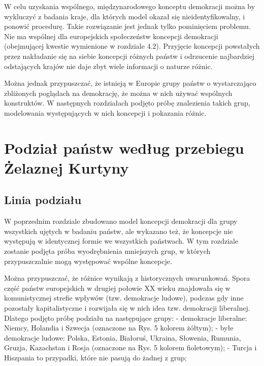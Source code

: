 \documentclass[12pt]{article}
\begin{document}
W celu uzyskania wspólnego, międzynarodowego konceptu demokracji można by wykluczyć z badania kraje, dla których model okazał się nieidentyfikowalny, i ponowić procedurę. Takie rozwiązanie jest jednak tylko pominięciem problemu. Nie ma wspólnej dla europejskich społeczeństw koncepcji demokracji (obejmującej kwestie wymienione w rozdziale 4.2). Przyjęcie koncepcji powstałych przez nakładanie się na siebie koncepcji różnych państw i odrzucenie najbardziej odstających krajów nie daje zbyt wiele informacji o naturze różnic.

Można jednak przypuszczać, że istnieją w Europie grupy państw o wystarczająco zbliżonych poglądach na demokrację, że można w nich używać wspólnych konstruktów. W następnych rozdziałach podjęto próbę znalezienia takich grup, modelowania występujących w nich koncepcji i pokazania różnic.

\newpage

\hypertarget{podziaux142-paux144stw-wedux142ug-przebiegu-ux17celaznej-kurtyny}{%
\section{Podział państw według przebiegu Żelaznej Kurtyny}\label{podziaux142-paux144stw-wedux142ug-przebiegu-ux17celaznej-kurtyny}}

\hypertarget{linia-podziaux142u}{%
\subsection{Linia podziału}\label{linia-podziaux142u}}

W poprzednim rozdziale zbudowano model koncepcji demokracji dla grupy wszystkich ujętych w badaniu państw, ale wykazano też, że koncepcje nie występują w identycznej formie we wszystkich państwach. W tym rozdziale zostanie podjęta próba wyodrębnienia mniejszych grup, w których przypuszczalnie mogą występować wspólne koncepcje.

Można przypuszczać, że różnice wynikają z historycznych uwarunkowań. Spora część państw europejskich w drugiej połowie XX wieku znajdowała się w komunistycznej strefie wpływów (tzw. demokracje ludowe), podczas gdy inne pozostały kapitalistyczne i rozwijała się w nich idea tzw. demokracji liberalnej. Dlatego podjęto próbę podziału na następujące grupy:
- demokracje liberalne: Niemcy, Holandia i Szwecja (oznaczone na Rys. 5 kolorem żółtym);
- byłe demokracje ludowe: Polska, Estonia, Białoruś, Ukraina, Słowenia, Rumunia, Gruzja, Kazachstan i Rosja (oznaczone na Rys. 5 kolorem fioletowym);
- Turcja i Hiszpania to przypadki, które nie pasują do żadnej z grup;
\end{document}
